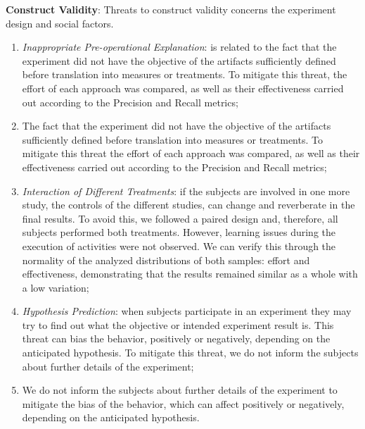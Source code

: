 \textbf{Construct Validity}: 
Threats to construct validity concerns the experiment design and social factors.
\begin{enumerate}[label=\roman*.]
    \item \textit{Inappropriate Pre-operational Explanation}: is related to the fact that the experiment did not have the objective of the artifacts sufficiently defined before translation into measures or treatments. To mitigate this threat, the effort of each approach was compared, as well as their effectiveness carried out according to the Precision and Recall metrics; 
    
    \item The fact that the experiment did not have the objective of the artifacts sufficiently defined before translation into measures or treatments. To mitigate this threat the effort of each approach was compared, as well as their effectiveness carried out according to the Precision and Recall metrics; 
   
    \item \textit{Interaction of Different Treatments}: 
    if the subjects are involved in one more study, the controls of the different studies, can change and reverberate in the final results.
    To avoid this, we followed a paired design and, therefore, all subjects performed both treatments.
    However, learning issues during the execution of activities were not observed.
    We can verify this through the normality of the analyzed distributions of both samples: effort and effectiveness, demonstrating that the results remained similar as a whole with a low variation; 
    
    
    \item \textit{Hypothesis Prediction}: 
    when subjects participate in an experiment they may try to find out what the objective or intended experiment result is. 
    This threat can bias the behavior, positively or negatively, depending on the anticipated hypothesis.
    To mitigate this threat, we do not inform the subjects about further details of the experiment; 
    
    \item We do not inform the subjects about further details of the experiment to mitigate the bias of the behavior, which can affect positively or negatively, depending on the anticipated hypothesis.
\end{enumerate}

